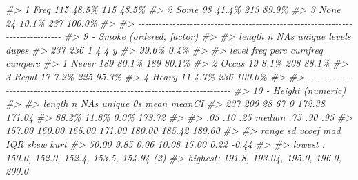 \documentclass[
]{book}
\newenvironment{Shaded}{\begin{snugshade}}{\end{snugshade}}
\newcommand{\CommentTok}[1]{\textcolor[rgb]{0.56,0.35,0.01}{\textit{#1}}}
\begin{document}
\begin{Shaded}
\begin{Highlighting}[]
\CommentTok{\#\textgreater{} 1   Freq   115  48.5\%      115    48.5\%}
\CommentTok{\#\textgreater{} 2   Some    98  41.4\%      213    89.9\%}
\CommentTok{\#\textgreater{} 3   None    24  10.1\%      237   100.0\%}
\CommentTok{\#\textgreater{} }
\CommentTok{\#\textgreater{} {-}{-}{-}{-}{-}{-}{-}{-}{-}{-}{-}{-}{-}{-}{-}{-}{-}{-}{-}{-}{-}{-}{-}{-}{-}{-}{-}{-}{-}{-}{-}{-}{-}{-}{-}{-}{-}{-}{-}{-}{-}{-}{-}{-}{-}{-}{-}{-}{-}{-}{-}{-}{-}{-}{-}{-}{-}{-}{-}{-}{-}{-}{-}{-}{-}{-}{-}{-}{-}{-}{-}{-}{-}{-}{-}{-}{-}{-} }
\CommentTok{\#\textgreater{} 9 {-} Smoke (ordered, factor)}
\CommentTok{\#\textgreater{} }
\CommentTok{\#\textgreater{}   length      n    NAs unique levels  dupes}
\CommentTok{\#\textgreater{}      237    236      1      4      4      y}
\CommentTok{\#\textgreater{}           99.6\%   0.4\%                     }
\CommentTok{\#\textgreater{} }
\CommentTok{\#\textgreater{}    level  freq   perc  cumfreq  cumperc}
\CommentTok{\#\textgreater{} 1  Never   189  80.1\%      189    80.1\%}
\CommentTok{\#\textgreater{} 2  Occas    19   8.1\%      208    88.1\%}
\CommentTok{\#\textgreater{} 3  Regul    17   7.2\%      225    95.3\%}
\CommentTok{\#\textgreater{} 4  Heavy    11   4.7\%      236   100.0\%}
\CommentTok{\#\textgreater{} }
\CommentTok{\#\textgreater{} {-}{-}{-}{-}{-}{-}{-}{-}{-}{-}{-}{-}{-}{-}{-}{-}{-}{-}{-}{-}{-}{-}{-}{-}{-}{-}{-}{-}{-}{-}{-}{-}{-}{-}{-}{-}{-}{-}{-}{-}{-}{-}{-}{-}{-}{-}{-}{-}{-}{-}{-}{-}{-}{-}{-}{-}{-}{-}{-}{-}{-}{-}{-}{-}{-}{-}{-}{-}{-}{-}{-}{-}{-}{-}{-}{-}{-}{-} }
\CommentTok{\#\textgreater{} 10 {-} Height (numeric)}
\CommentTok{\#\textgreater{} }
\CommentTok{\#\textgreater{}   length       n     NAs  unique      0s    mean  meanCI\textquotesingle{}}
\CommentTok{\#\textgreater{}      237     209      28      67       0  172.38  171.04}
\CommentTok{\#\textgreater{}            88.2\%   11.8\%            0.0\%          173.72}
\CommentTok{\#\textgreater{}                                                         }
\CommentTok{\#\textgreater{}      .05     .10     .25  median     .75     .90     .95}
\CommentTok{\#\textgreater{}   157.00  160.00  165.00  171.00  180.00  185.42  189.60}
\CommentTok{\#\textgreater{}                                                         }
\CommentTok{\#\textgreater{}    range      sd   vcoef     mad     IQR    skew    kurt}
\CommentTok{\#\textgreater{}    50.00    9.85    0.06   10.08   15.00    0.22   {-}0.44}
\CommentTok{\#\textgreater{}                                                         }
\CommentTok{\#\textgreater{} lowest : 150.0, 152.0, 152.4, 153.5, 154.94 (2)}
\CommentTok{\#\textgreater{} highest: 191.8, 193.04, 195.0, 196.0, 200.0}

\end{Highlighting}
\end{Shaded}
\end{document}
